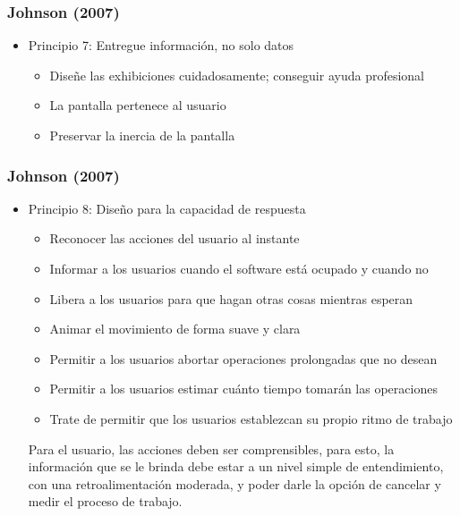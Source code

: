 \documentclass[11pt]{beamer}
\begin{document}
\begin{frame}
\frametitle{Johnson (2007)}
\begin{itemize}
\color{red}
\item Principio 7: Entregue información, no solo datos
    \par
    \justify
    \color{black}
    \begin{itemize}
    \item Diseñe las exhibiciones cuidadosamente; conseguir ayuda profesional
	\item La pantalla pertenece al usuario 
	\item Preservar la inercia de la pantalla 
    \end{itemize}
\end{itemize}
\end{frame}

\begin{frame}
\frametitle{Johnson (2007)}
\begin{itemize}
\color{red}
\item Principio 8: Diseño para la capacidad de respuesta
    \par
    \justify
    \color{black}
    \begin{itemize}
    \item Reconocer las acciones del usuario al instante 
	\item Informar a los usuarios cuando el software está ocupado y cuando no 
	\item Libera a los usuarios para que hagan otras cosas mientras esperan 
	\item Animar el movimiento de forma suave y clara 
	\item Permitir a los usuarios abortar operaciones prolongadas que no desean
	\item Permitir a los usuarios estimar cuánto tiempo tomarán las operaciones
	\item Trate de permitir que los usuarios establezcan su propio ritmo de trabajo
    \end{itemize}
    \par
    Para el usuario, las acciones deben ser comprensibles, para esto, la información que se le brinda debe estar a un nivel simple de entendimiento, con una retroalimentación moderada, y poder darle la opción de cancelar y medir el proceso de trabajo.
\end{itemize}
\end{frame}
\end{document}

